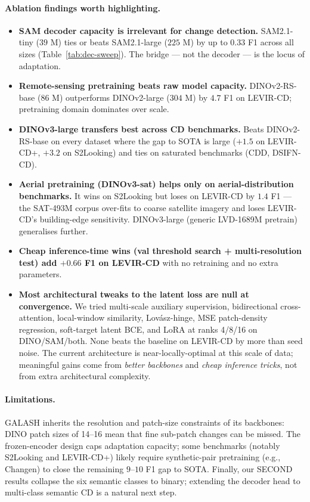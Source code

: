 \paragraph{Ablation findings worth highlighting.}
\begin{itemize}
  \item \textbf{SAM decoder capacity is irrelevant for change detection.}
    SAM2.1-tiny ($39$ M) ties or beats SAM2.1-large ($225$ M) by up to
    $0.33$ F1 across all sizes (Table~\ref{tab:dec-sweep}). The bridge
    --- not the decoder --- is the locus of adaptation.
  \item \textbf{Remote-sensing pretraining beats raw model capacity.}
    DINOv2-RS-base ($86$ M) outperforms DINOv2-large ($304$ M) by $4.7$
    F1 on LEVIR-CD; pretraining domain dominates over scale.
  \item \textbf{DINOv3-large transfers best across CD benchmarks.}
    Beats DINOv2-RS-base on every dataset where the gap to SOTA is large
    ($+1.5$ on LEVIR-CD+, $+3.2$ on S2Looking) and ties on saturated
    benchmarks (CDD, DSIFN-CD).
  \item \textbf{Aerial pretraining (DINOv3-sat) helps only on
    aerial-distribution benchmarks.} It wins on S2Looking but loses on
    LEVIR-CD by $1.4$ F1 --- the SAT-493M corpus over-fits to coarse
    satellite imagery and loses LEVIR-CD's building-edge sensitivity.
    DINOv3-large (generic LVD-1689M pretrain) generalises further.
  \item \textbf{Cheap inference-time wins (val threshold search +
    multi-resolution test) add $+0.66$ F1 on LEVIR-CD} with no
    retraining and no extra parameters.
  \item \textbf{Most architectural tweaks to the latent loss are null
    at convergence.} We tried multi-scale auxiliary supervision,
    bidirectional cross-attention, local-window similarity,
    Lovász-hinge, MSE patch-density regression, soft-target latent BCE,
    and LoRA at ranks 4/8/16 on DINO/SAM/both. None beats the baseline
    on LEVIR-CD by more than seed noise. The current architecture is
    near-locally-optimal at this scale of data; meaningful gains come
    from \emph{better backbones} and \emph{cheap inference tricks},
    not from extra architectural complexity.
\end{itemize}

\paragraph{Limitations.} GALASH inherits the resolution and patch-size
constraints of its backbones: DINO patch sizes of 14--16 mean that fine
sub-patch changes can be missed. The frozen-encoder design caps adaptation
capacity; some benchmarks (notably S2Looking and LEVIR-CD+) likely require
synthetic-pair pretraining (e.g., Changen) to close the remaining $9$--$10$
F1 gap to SOTA. Finally, our SECOND results collapse the six semantic
classes to binary; extending the decoder head to multi-class semantic CD
is a natural next step.


